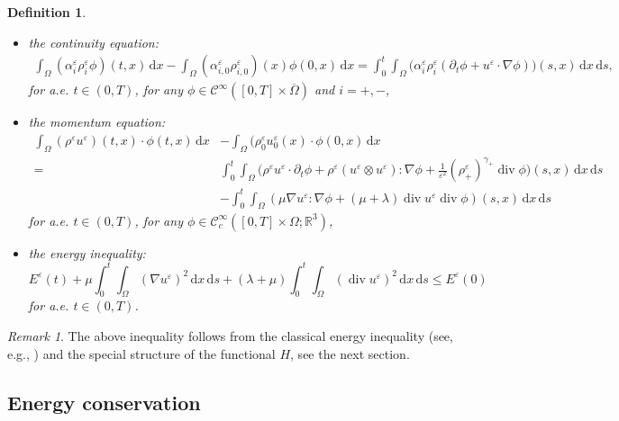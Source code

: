 \documentclass[11pt, twoside, a4paper]{article}
\theoremstyle{plain}
\newtheorem{definition}[theorem]{Definition}
\theoremstyle{remark}
\newtheorem{remark}[theorem]{Remark}
\numberwithin{equation}{section}
\def\R{{\mathbb R}}%
\newcommand{\dd}{\,\mathrm{d}}
\renewcommand{\div}{\operatorname{div}}
\renewcommand{\epsilon}{\varepsilon}
\newcommand{\dt}{\partial_t}
\newcommand{\eps}{\varepsilon}
\begin{document}
\begin{definition}
\begin{itemize}
 \item the continuity equation:
 \begin{align*}
 \int_\Omega (\alpha_i^\eps \rho_i^\eps \phi)(t,x) \dd x -\int_\Omega (\alpha_{i,0}^\eps \rho_{i,0}^\eps)(x) \phi(0,x) \dd x = \int_0^t\!\!\! \int_\Omega \Big(\alpha_i^\eps \rho_i^\eps(\dt \phi + u^\eps \cdot \nabla \phi)\Big)(s,x) \dd x \dd s,
 \end{align*}
 for a.e. $t\in (0,T)$, for any $\phi \in \mathcal{C}^\infty ([0,T]\times \overline{\Omega})$ and $i=+,-$,
 \item the momentum equation:
 \begin{align*}
 \int_\Omega (\rho^\eps u^\eps)(t,x)\cdot \phi(t,x) \dd x &- \int_\Omega (\rho^\eps_0 u^\eps_0(x) \cdot \phi(0,x) \dd x \\
 =& \int_0^t\!\!\! \int_\Omega \Big( \rho^\eps u^\eps \cdot \dt \phi + \rho^\eps (u^\eps \otimes u^\eps) : \nabla \phi+ \frac{1}{\eps^2} (\rho_+^{\epsilon})^{\gamma_+} \div \phi \Big)(s,x) \dd x \dd s \\
 & -\int_0^t\!\!\! \int_\Omega \left(\mu \nabla u^\eps : \nabla \phi + (\mu + \lambda) \div u^\eps \div \phi \right)(s,x) \dd x \dd s 
 \end{align*}
 for a.e. $t\in (0,T)$, for any $\phi \in \mathcal{C}_c^\infty ([0,T]\times \Omega;\R^3)$,
 \item the energy inequality:
 \begin{equation}\label{energy_estimate}
 E^\eps(t) +\mu \int_0^t\!\!\! \int_{\Omega}\left( \nabla u^\eps \right)^2 \dd x \dd s +\left(\lambda + \mu\right) \int_0^t\!\!\! \int_{\Omega} (\div u^\eps )^2 \dd x \dd s \leqslant E^\eps(0)
 \end{equation}
 for a.e. $t \in(0, T)$.
 \end{itemize}
\end{definition}

\begin{remark}
The above inequality follows from the classical energy inequality (see, e.g., \cite{novotny2020weak}) and the special structure of the functional $H$, see the next section.
\end{remark}

\subsection{Energy conservation}\label{conservation-energy}
\end{document}
